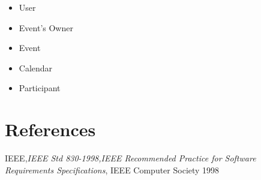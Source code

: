 \begin{itemize}


\item User
\item Event's Owner
\item Event
\item Calendar
\item Participant 
\end{itemize}
\section{References}
IEEE,{\it IEEE Std 830-1998,IEEE Recommended Practice for Software Requirements Specifications},  IEEE Computer Society 1998

 